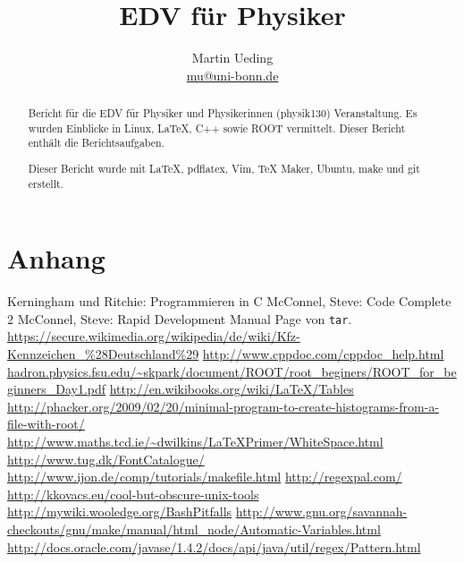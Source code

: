 \documentclass[12pt]{report}
\title{EDV für Physiker}
\author{Martin Ueding \\ \href{mailto:mu@uni-bonn.de}{mu@uni-bonn.de}}
\newcommand\gqq[1]{\glqq #1\grqq}
\begin{document}
\maketitle

\begin{abstract}
Bericht für die \gqq{EDV für Physiker und Physikerinnen} (physik130) Veranstaltung. Es wurden Einblicke in Linux, \LaTeX, C++ sowie ROOT vermittelt. Dieser Bericht enthält die Berichtsaufgaben.

Dieser Bericht wurde mit \LaTeX, pdflatex, Vim, TeX Maker, Ubuntu, make und git erstellt.
\end{abstract}

\newpage

\tableofcontents
\newpage








\part{Anhang}

\lstlistoflistings

\begin{thebibliography}{n}
 Kerningham und Ritchie: \gqq{Programmieren in C}
 McConnel, Steve: \gqq{Code Complete 2}
 McConnel, Steve: \gqq{Rapid Development}
 Manual Page von \texttt{tar}.
 \url{https://secure.wikimedia.org/wikipedia/de/wiki/Kfz-Kennzeichen_\%28Deutschland\%29}
 \url{http://www.cppdoc.com/cppdoc_help.html}
 \url{hadron.physics.fsu.edu/~skpark/document/ROOT/root_beginers/ROOT_for_beginners_Day1.pdf}
 \url{http://en.wikibooks.org/wiki/LaTeX/Tables}
 \url{http://phacker.org/2009/02/20/minimal-program-to-create-histograms-from-a-file-with-root/}
 \url{http://www.maths.tcd.ie/~dwilkins/LaTeXPrimer/WhiteSpace.html}
 \url{http://www.tug.dk/FontCatalogue/}
 \url{http://www.ijon.de/comp/tutorials/makefile.html}
 \url{http://regexpal.com/}
 \url{http://kkovacs.eu/cool-but-obscure-unix-tools}
 \url{http://mywiki.wooledge.org/BashPitfalls}
 \url{http://www.gnu.org/savannah-checkouts/gnu/make/manual/html_node/Automatic-Variables.html}
 \url{http://docs.oracle.com/javase/1.4.2/docs/api/java/util/regex/Pattern.html}
\end{thebibliography}
\end{document}
